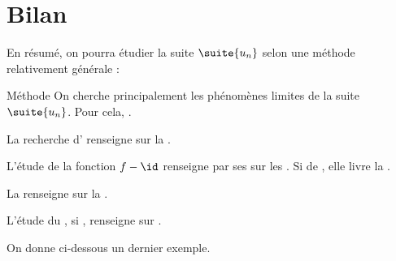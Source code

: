 \documentclass[a4paper,french,bookmarks]{article}
\begin{document}
\section{Bilan}

En résumé, on pourra étudier la suite $\suite{u_n}$ selon une méthode relativement générale : 

\begin{form}{Méthode}{}
    On cherche principalement les phénomènes limites de la suite $\suite{u_n}$. Pour cela, .
    
    \begin{enumerate}
        \ithand La recherche d' renseigne sur la .
        
        \ithand L'étude de la fonction $f - \id$ renseigne par ses  sur les . Si de , elle livre la .
        
        \ithand La  renseigne sur la .
        
        \ithand L'étude du , si , renseigne sur .
    \end{enumerate}
\end{form}

On donne ci-dessous un dernier exemple.
\end{document}
